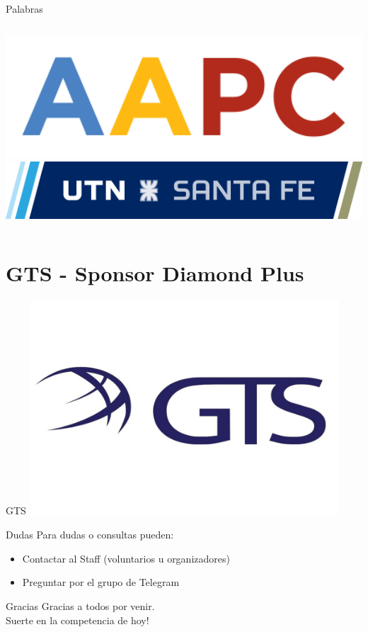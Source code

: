 \documentclass{beamer}
\begin{document}
\begin{frame}{Palabras}
    \begin{columns}[t]
        \centering
        \includegraphics[width=1\textwidth]{logos/aapc.png}
        \centering
        \includegraphics[width=1\textwidth]{logos/utn_santafe.png}
    \end{columns}
\end{frame}

\section{GTS - Sponsor Diamond Plus}
    
\begin{frame}{GTS}
    \centering
    \includegraphics[height=8cm,keepaspectratio]{logos/GTSlogo.jpeg}
\end{frame}

\begin{frame}{Dudas}
Para dudas o consultas pueden:
        \begin{itemize}
            \item Contactar al Staff (voluntarios u organizadores)
            \item Preguntar por el grupo de Telegram
        \end{itemize}
\end{frame}

\begin{frame}{Gracias}
    \centering
    Gracias a todos por venir.\\
    Suerte en la competencia de hoy!
\end{frame}
\end{document}
